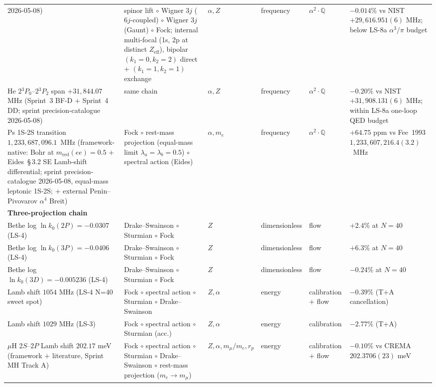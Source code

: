 \documentclass[11pt]{article}
\begin{document}
\begin{longtable}{p{3.5cm} p{2.8cm} p{1.3cm} p{2.2cm} p{1.8cm} p{1.4cm}}
2026-05-08) & spinor lift $\circ$ Wigner $3j$ ($6j$-coupled) $\circ$
Wigner $3j$ (Gaunt) $\circ$ Fock; internal multi-focal (1s, 2p at
distinct $Z_\text{eff}$), bipolar $(k_1{=}0,k_2{=}2)$ direct +
$(k_1{=}1,k_2{=}1)$ exchange & $\alpha, Z$ & frequency &
$\alpha^2{\cdot}\mathbb{Q}$ & $-0.014\%$ vs NIST $+29{,}616.951(6)$ MHz;
below LS-8a $\alpha^3/\pi$ budget \\
He $2{}^3P_0$--$2{}^3P_2$ span $+31{,}844.07$ MHz (Sprint~3 BF-D
+ Sprint~4 DD; sprint precision-catalogue 2026-05-08) & same chain &
$\alpha, Z$ & frequency & $\alpha^2{\cdot}\mathbb{Q}$ &
$-0.20\%$ vs NIST $+31{,}908.131(6)$ MHz; within LS-8a one-loop QED budget \\
Ps 1S-2S transition $1{,}233{,}687{,}096.1$~MHz (framework-native: Bohr at
$m_\text{red}(ee) = 0.5$ $+$ Eides~\S\,3.2 SE Lamb-shift differential;
sprint precision-catalogue 2026-05-08, equal-mass leptonic 1S-2S; $+$
external Penin--Pivovarov $\alpha^4$ Breit) & Fock $\circ$ rest-mass
projection (equal-mass limit $\lambda_a = \lambda_b = 0.5$) $\circ$
spectral action (Eides) & $\alpha, m_e$ & frequency &
$\alpha^2{\cdot}\mathbb{Q}$ & $+64.75$ ppm vs Fee~1993
$1{,}233{,}607{,}216.4(3.2)$~MHz \\
\midrule
\textbf{Three-projection chain} & & & & & \\
Bethe log $\ln k_0(2P) = -0.0307$ (LS-4) & Drake--Swainson $\circ$ Sturmian
$\circ$ Fock & $Z$ & dimensionless & flow & $+2.4\%$ at $N=40$ \\
Bethe log $\ln k_0(3P) = -0.0406$ (LS-4) & Drake--Swainson $\circ$ Sturmian
$\circ$ Fock & $Z$ & dimensionless & flow & $+6.3\%$ at $N=40$ \\
Bethe log $\ln k_0(3D) = -0.005236$ (LS-4) & Drake--Swainson $\circ$ Sturmian
$\circ$ Fock & $Z$ & dimensionless & flow & $-0.24\%$ at $N=40$ \\
Lamb shift $1054$ MHz (LS-4 N=40 sweet spot) & Fock $\circ$ spectral action
$\circ$ Sturmian $\circ$ Drake--Swainson & $Z, \alpha$ & energy & calibration
$+$ flow & $-0.39\%$ (T$+$A cancellation) \\
Lamb shift $1029$ MHz (LS-3) & Fock $\circ$ spectral action $\circ$
Sturmian (acc.) & $Z, \alpha$ & energy & calibration & $-2.77\%$ (T$+$A)\\
$\mu$H 2$S$--2$P$ Lamb shift $202.17$ meV (framework $+$ literature,
Sprint MH Track A) & Fock $\circ$ spectral action $\circ$ Sturmian
$\circ$ Drake--Swainson $\circ$ rest-mass projection ($m_e \to m_\mu$)
& $Z, \alpha, m_\mu/m_e, r_p$ & energy & calibration $+$ flow &
$-0.10\%$ vs CREMA $202.3706(23)$ meV \\

\end{longtable}
\end{document}
